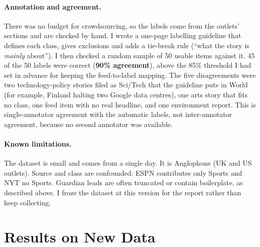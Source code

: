 \documentclass[11pt]{article}
\begin{document}
\paragraph{Annotation and agreement.} There was no budget for crowdsourcing, so the labels
come from the outlets' sections and are checked by hand. I wrote a one-page labelling
guideline that defines each class, gives exclusions and adds a tie-break rule (``what the
story is \emph{mainly} about''). I then checked a random sample of 50 usable items against
it. 45 of the 50 labels were correct (\textbf{90\% agreement}), above the 85\% threshold I had
set in advance for keeping the feed-to-label mapping. The five disagreements were two
technology-policy stories filed as Sci/Tech that the guideline puts in World (for example,
Finland halting two Google data centres), one arts story that fits no class, one feed item
with no real headline, and one environment report. This is single-annotator agreement with
the automatic labels, not inter-annotator agreement, because no second annotator was
available.

\paragraph{Known limitations.} The dataset is small and comes from a single day. It is
Anglophone (UK and US outlets). Source and class are confounded: ESPN contributes only Sports
and NYT no Sports. Guardian leads are often truncated or contain boilerplate, as described
above. I froze the dataset at
this version for the report rather than keep collecting.

\section{Results on New Data}
\end{document}
